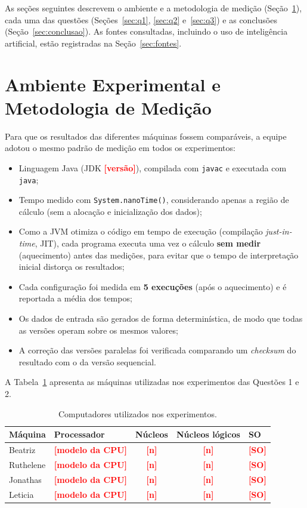 \documentclass[12pt]{article}
\newcommand{\todo}[1]{\textcolor{red}{\textbf{[#1]}}}
\begin{document}
As seções seguintes descrevem o ambiente e a metodologia de medição (Seção~\ref{sec:metodo}), cada uma das questões (Seções~\ref{sec:q1}, \ref{sec:q2} e~\ref{sec:q3}) e as conclusões (Seção~\ref{sec:conclusao}). As fontes consultadas, incluindo o uso de inteligência artificial, estão registradas na Seção~\ref{sec:fontes}.

\section{Ambiente Experimental e Metodologia de Medição}
\label{sec:metodo}

Para que os resultados das diferentes máquinas fossem comparáveis, a equipe adotou o mesmo padrão de medição em todos os experimentos:

\begin{itemize}
  \item Linguagem Java (JDK \todo{versão}), compilada com \texttt{javac} e executada com \texttt{java};
  \item Tempo medido com \texttt{System.nanoTime()}, considerando apenas a região de cálculo (sem a alocação e inicialização dos dados);
  \item Como a JVM otimiza o código em tempo de execução (compilação \textit{just-in-time}, JIT), cada programa executa uma vez o cálculo \textbf{sem medir} (aquecimento) antes das medições, para evitar que o tempo de interpretação inicial distorça os resultados;
  \item Cada configuração foi medida em \textbf{5 execuções} (após o aquecimento) e é reportada a média dos tempos;
  \item Os dados de entrada são gerados de forma determinística, de modo que todas as versões operam sobre os mesmos valores;
  \item A correção das versões paralelas foi verificada comparando um \textit{checksum} do resultado com o da versão sequencial.
\end{itemize}

A Tabela~\ref{tab:maquinas} apresenta as máquinas utilizadas nos experimentos das Questões 1 e 2.

\begin{table}[H]
\centering
\caption{Computadores utilizados nos experimentos.}
\label{tab:maquinas}
\begin{tabular}{llccl}
\toprule
\textbf{Máquina} & \textbf{Processador} & \textbf{Núcleos} & \textbf{Núcleos lógicos} & \textbf{SO} \\
\midrule
Beatriz     & \todo{modelo da CPU} & \todo{n} & \todo{n} & \todo{SO} \\
Ruthelene   & \todo{modelo da CPU} & \todo{n} & \todo{n} & \todo{SO} \\
Jonathas    & \todo{modelo da CPU} & \todo{n} & \todo{n} & \todo{SO} \\
Leticia     & \todo{modelo da CPU} & \todo{n} & \todo{n} & \todo{SO} \\
\bottomrule
\end{tabular}
\end{table}
\end{document}
